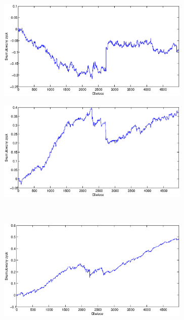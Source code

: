 \begin{figure}[h]
\centering
\begin{minipage}{.49\linewidth}
\centering
\includegraphics[width=0.82\textwidth]{images/S1a_gbpchf.eps}
\label{jedno}
\end{minipage}
\begin{minipage}{.49\linewidth}
\centering
\includegraphics[width=0.82\textwidth]{images/S1b_gbpchf.eps}
\label{dwu}
\end{minipage}
\\
\begin{minipage}{.49\linewidth}
\centering
\includegraphics[width=0.82\textwidth]{images/S1c_gbpchf.eps}
\label{cztero}
\end{minipage}
\begin{minipage}{.49\linewidth}
\centering

\end{minipage}
\end{figure}
